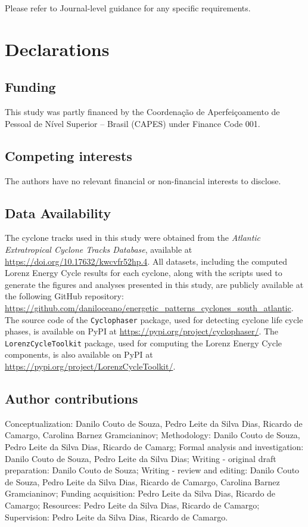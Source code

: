 \documentclass[pdflatex,sn-chicago]{sn-jnl}%
\theoremstyle{plain}
\theoremstyle{definition}
\theoremstyle{remark}
\theoremstyle{definition}
\begin{document}
Please refer to Journal-level guidance for any specific requirements.

\section*{Declarations}

\subsection*{Funding}

This study was partly financed by the Coordenação de Aperfeiçoamento de Pessoal de Nível Superior – Brasil (CAPES) under Finance Code 001.

\subsection*{Competing interests}

The authors have no relevant financial or non-financial interests to disclose.

\subsection*{Data Availability}

The cyclone tracks used in this study were obtained from the \textit{Atlantic Extratropical Cyclone Tracks Database}, available at \url{https://doi.org/10.17632/kwcvfr52hp.4}. All datasets, including the computed Lorenz Energy Cycle results for each cyclone, along with the scripts used to generate the figures and analyses presented in this study, are publicly available at the following GitHub repository: \url{https://github.com/daniloceano/energetic_patterns_cyclones_south_atlantic}. The source code of the \texttt{Cyclophaser} package, used for detecting cyclone life cycle phases, is available on PyPI at \url{https://pypi.org/project/cyclophaser/}. The \texttt{LorenzCycleToolkit} package, used for computing the Lorenz Energy Cycle components, is also available on PyPI at \url{https://pypi.org/project/LorenzCycleToolkit/}.

\subsection*{Author contributions}

Conceptualization: Danilo Couto de Souza, Pedro Leite da Silva Dias, Ricardo de Camargo, Carolina Barnez Gramcianinov; Methodology: Danilo Couto de Souza, Pedro Leite da Silva Dias, Ricardo de Camarg; Formal analysis and investigation: Danilo Couto de Souza, Pedro Leite da Silva Dias; Writing - original draft preparation: Danilo Couto de Souza; Writing - review and editing: Danilo Couto de Souza, Pedro Leite da Silva Dias, Ricardo de Camargo, Carolina Barnez Gramcianinov; Funding acquisition: Pedro Leite da Silva Dias, Ricardo de Camargo; Resources: Pedro Leite da Silva Dias, Ricardo de Camargo; Supervision: Pedro Leite da Silva Dias, Ricardo de Camargo.

\end{document}
